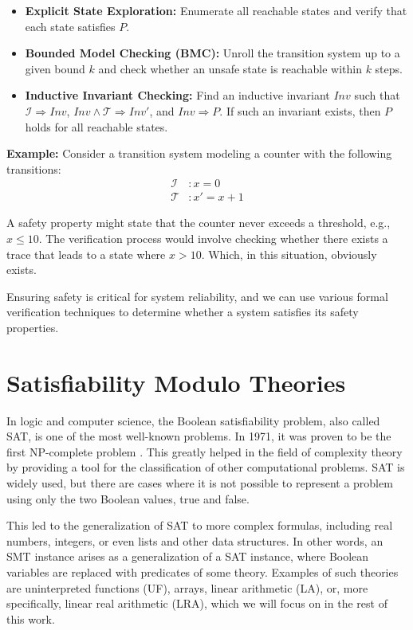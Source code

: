 \begin{itemize}
    \item \textbf{Explicit State Exploration:} Enumerate all reachable states and verify that each state satisfies $P$.
    \item \textbf{Bounded Model Checking (BMC):} Unroll the transition system up to a given bound $k$ and check whether an unsafe state is reachable within $k$ steps.
    \item \textbf{Inductive Invariant Checking:} Find an inductive invariant $Inv$ such that $\mathcal{I} \Rightarrow Inv$, $Inv \land \mathcal{T} \Rightarrow Inv'$, and $Inv \Rightarrow P$. If such an invariant exists, then $P$ holds for all reachable states.
\end{itemize}

\vspace{\baselineskip}\noindent\textbf{Example:} Consider a transition system modeling a counter with the following transitions:
\begin{align*}
    \mathcal{I}&: x = 0 \\
    \mathcal{T}&: x' = x + 1
\end{align*}

A safety property might state that the counter never exceeds a threshold, e.g., $x \leq 10$. The verification process would involve checking whether there exists a trace that leads to a state where $x > 10$. Which, in this situation, obviously exists.

Ensuring safety is critical for system reliability, and we can use various formal verification techniques to determine whether a system satisfies its safety properties.

\section{Satisfiability Modulo Theories}
\noindent In logic and computer science, the Boolean satisfiability problem, also called SAT, is one of the most well-known problems. In 1971, it was proven to be the first NP-complete problem \cite{10.1145/800157.805047}. This greatly helped in the field of complexity theory by providing a tool for the classification of other computational problems. SAT is widely used, but there are cases where it is not possible to represent a problem using only the two Boolean values, true and false.

This led to the generalization of SAT to more complex formulas, including real numbers, integers, or even lists and other data structures. In other words, an SMT instance arises as a generalization of a SAT instance, where Boolean variables are replaced with predicates of some theory. Examples of such theories are uninterpreted functions (UF), arrays, linear arithmetic (LA), or, more specifically, linear real arithmetic (LRA), which we will focus on in the rest of this work.

